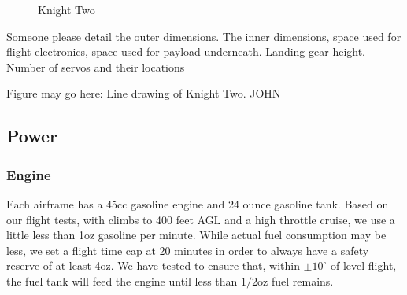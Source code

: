 \documentclass[10pt]{report}
\newcommand{\degrees}[1]
{
\begin{math}
#1^{\circ} 
\end{math}
}
\begin{document}
\begin{figure}
	\centering
  	\label{fig:knighttwo}
  	\caption[Knight Two]{Knight Two}
\end{figure}
Someone please detail the outer dimensions. The inner dimensions, space used for flight electronics, space used for payload underneath. Landing gear height. Number of servos and their locations

Figure may go here: Line drawing of Knight Two. JOHN

\subsection{Power}

\subsubsection{Engine}

Each airframe has a 45cc gasoline engine and 24 ounce gasoline tank. Based on our flight tests, with climbs to 400 feet AGL and a high throttle cruise, we use a little less than 1oz gasoline per minute. While actual fuel consumption may be less, we set a flight time cap at 20 minutes in order to always have a safety reserve of at least 4oz. We have tested to ensure that, within \degrees{\pm10} of level flight, the fuel tank will feed the engine until less than $1/2$oz fuel remains.
\end{document}
